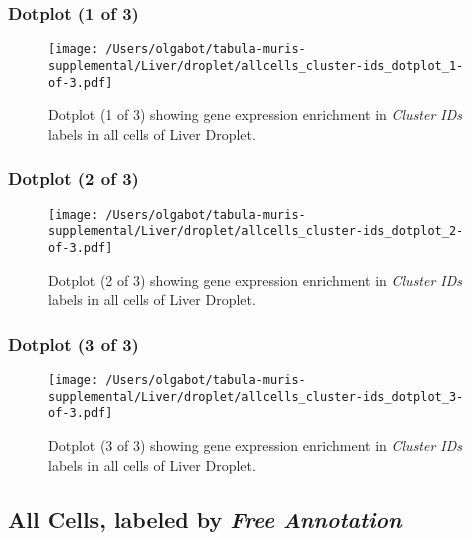 \clearpage

\subsubsection{Dotplot (1 of 3)}
\begin{figure}[h]
\centering
\texttt{[image: /Users/olgabot/tabula-muris-supplemental/Liver/droplet/allcells\_cluster-ids\_dotplot\_1-of-3.pdf]}

\caption{ Dotplot (1 of 3)  showing gene expression enrichment in \emph{Cluster IDs} labels in all cells of Liver Droplet. }
\end{figure}


\clearpage

\subsubsection{Dotplot (2 of 3)}
\begin{figure}[h]
\centering
\texttt{[image: /Users/olgabot/tabula-muris-supplemental/Liver/droplet/allcells\_cluster-ids\_dotplot\_2-of-3.pdf]}

\caption{ Dotplot (2 of 3)  showing gene expression enrichment in \emph{Cluster IDs} labels in all cells of Liver Droplet. }
\end{figure}


\clearpage

\subsubsection{Dotplot (3 of 3)}
\begin{figure}[h]
\centering
\texttt{[image: /Users/olgabot/tabula-muris-supplemental/Liver/droplet/allcells\_cluster-ids\_dotplot\_3-of-3.pdf]}

\caption{ Dotplot (3 of 3)  showing gene expression enrichment in \emph{Cluster IDs} labels in all cells of Liver Droplet. }
\end{figure}


\clearpage

\subsection{All Cells, labeled by \emph{Free Annotation}}

